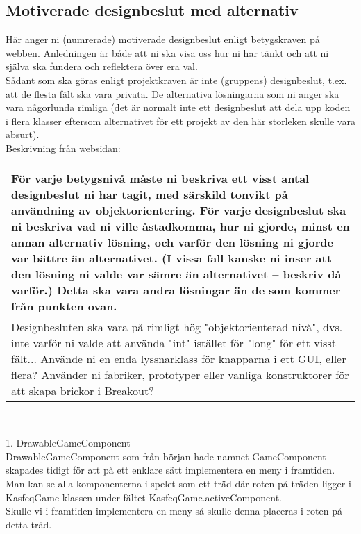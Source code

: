 \subsection{Motiverade designbeslut med alternativ}
{\color{red}Här anger ni (numrerade) motiverade designbeslut enligt betygskraven på webben.  Anledningen är både att ni ska visa oss hur ni har tänkt och att ni själva ska fundera och reflektera över era val.\\
Sådant som ska göras enligt projektkraven är inte (gruppens) designbeslut, t.ex. att de flesta fält ska vara privata.  De alternativa lösningarna som ni anger ska vara någorlunda rimliga (det är normalt inte ett designbeslut att dela upp koden i flera klasser eftersom alternativet för ett projekt av den här storleken skulle vara absurt).\\
Beskrivning från websidan:\\
\begin{tabular}{| p{11cm} |}
    \hline
    För varje betygsnivå måste ni beskriva ett visst antal designbeslut ni har tagit, med särskild tonvikt på användning av objektorientering. För varje designbeslut ska ni beskriva vad ni ville åstadkomma, hur ni gjorde, minst en annan alternativ lösning, och varför den lösning ni gjorde var bättre än alternativet. (I vissa fall kanske ni inser att den lösning ni valde var sämre än alternativet – beskriv då varför.) Detta ska vara andra lösningar än de som kommer från punkten ovan. \\ \hline
    Designbesluten ska vara på rimligt hög "objektorienterad nivå", dvs. inte varför ni valde att använda "int" istället för "long" för ett visst fält... Använde ni en enda lyssnarklass för knapparna i ett GUI, eller flera? Använder ni fabriker, prototyper eller vanliga konstruktorer för att skapa brickor i Breakout? \\ \hline
\end{tabular}\\}
\vspace{11pt}
1. DrawableGameComponent\\
DrawableGameComponent som från början hade namnet GameComponent skapades tidigt för att på ett enklare sätt implementera en meny i framtiden.\\
Man kan se alla komponenterna i spelet som ett träd där roten på träden ligger i KasfeqGame klassen under fältet KasfeqGame.activeComponent.\\
Skulle vi i framtiden implementera en meny så skulle denna placeras i roten på detta träd.\\
